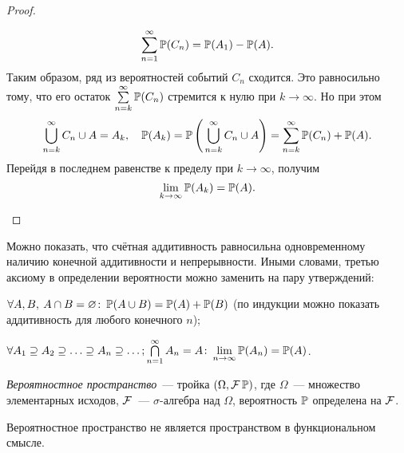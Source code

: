 \begin{proof}
\begin{enumerate}
\begin{gather*}
		      	\sum\limits_{n=1}^{\infty} \operatorname{\mathbb{P}}(C_n) = \operatorname{\mathbb{P}}(A_1) - \operatorname{\mathbb{P}}(A).
		      \end{gather*}
		      Таким образом, ряд из вероятностей событий $C_n$ сходится. 
		      Это равносильно тому, что его остаток $\sum\limits_{n=k}^{\infty} \operatorname{\mathbb{P}}(C_n)$ стремится к нулю при $k \to \infty$. 
		      Но при этом
		      \begin{equation*}
		      	\bigcup\limits_{n = k}^{\infty} C_n \cup A = A_k, \quad \operatorname{\mathbb{P}}(A_k) = \operatorname{\mathbb{P}}\left(\, {\bigcup\limits_{n = k}^{\infty} C_n \cup A} \right) = \sum\limits_{n=k}^{\infty} \operatorname{\mathbb{P}}(C_n) + \operatorname{\mathbb{P}}(A).
		      \end{equation*}
		      Перейдя в последнем равенстве к пределу при $k \to \infty$, получим
			  \begin{equation*}
				\lim\limits_{k \to \infty} \operatorname{\mathbb{P}}(A_k) = \operatorname{\mathbb{P}}(A).
			  \end{equation*}
	\end{enumerate}
\end{proof}

\begin{rmrk}
	Можно показать, что счётная аддитивность равносильна одновременному наличию конечной аддитивности и непрерывности. 
	Иными словами, третью аксиому в определении вероятности можно заменить на пару утверждений:
	\begin{compactlist}
		\item 
		      $\forall A, B, \: A \cap B = \varnothing \colon \operatorname{\mathbb{P}}(A \cup B) = \operatorname{\mathbb{P}}(A) + \operatorname{\mathbb{P}}(B)$ 
		      (по индукции можно показать аддитивность для любого конечного $n$);
		\item 
		      $\forall A_1 \supseteq A_2 \supseteq \ldots \supseteq A_n \supseteq \ldots; \bigcap\limits_{n = 1}^{\infty} A_n = A \colon \lim\limits_{n \to \infty}\operatorname{\mathbb{P}}(A_n) = \operatorname{\mathbb{P}}(A)$.
	\end{compactlist}
\end{rmrk}

\hypertarget{prob_space}{}
\begin{defn}
	\textit{Вероятностное пространство}~--- тройка $(\Omega, \mathcal{F} \operatorname{\mathbb{P}})$, где $\Omega$~--- множество элементарных исходов, 
	$\mathcal{F}$~--- $\sigma$-алгебра над $\Omega$, вероятность $\operatorname{\mathbb{P}}$ определена на $\mathcal{F}$.
\end{defn}
\begin{rmrk}
	Вероятностное пространство не является пространством в функциональном смысле.
\end{rmrk}

